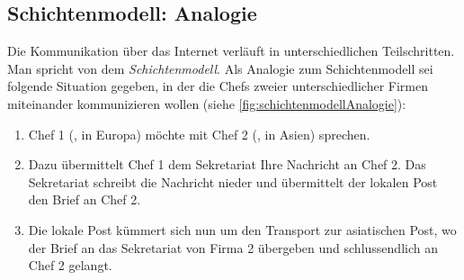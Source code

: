 \subsection{Schichtenmodell: Analogie}
Die Kommunikation über das Internet verläuft in unterschiedlichen Teilschritten. Man spricht von dem \textit{Schichtenmodell}. Als Analogie zum Schichtenmodell sei folgende Situation gegeben, in der die Chefs zweier unterschiedlicher Firmen miteinander kommunizieren wollen (siehe \cref{fig:schichtenmodellAnalogie}):
\begin{enumerate}
	\item Chef 1 (\faFemale, in Europa) möchte mit Chef 2 (\faMale, in Asien) sprechen.
	\item Dazu übermittelt Chef 1 dem Sekretariat Ihre Nachricht an Chef 2. Das Sekretariat schreibt die Nachricht nieder und übermittelt der lokalen Post den Brief an Chef 2.
	\item Die lokale Post kümmert sich nun um den Transport zur asiatischen Post, wo der Brief an das Sekretariat von Firma 2 übergeben und schlussendlich an Chef 2 gelangt.
\end{enumerate}

